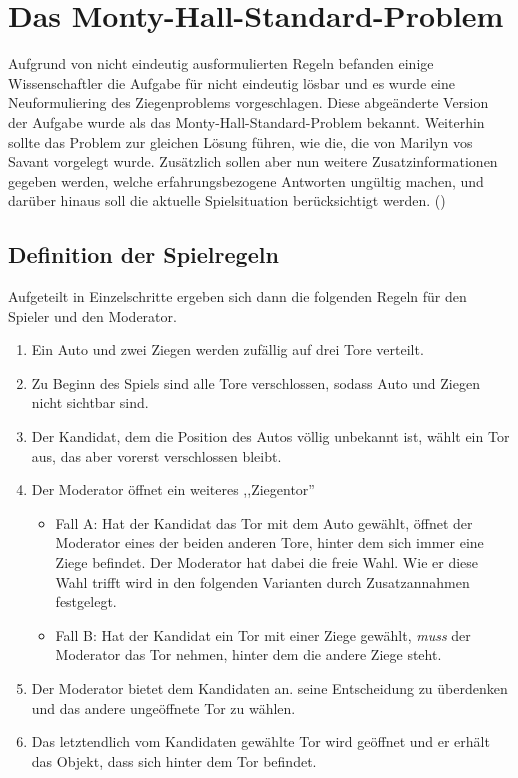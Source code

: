 \chapter{Das Monty-Hall-Standard-Problem} \label{chap:monty-hall-standard}

Aufgrund von nicht eindeutig ausformulierten Regeln befanden einige Wissenschaftler die Aufgabe für nicht eindeutig lösbar und es wurde eine Neuformuliering des
Ziegenproblems vorgeschlagen. Diese abgeänderte Version der Aufgabe wurde als das Monty-Hall-Standard-Problem bekannt. Weiterhin sollte das Problem zur gleichen
Lösung führen, wie die, die von Marilyn vos Savant vorgelegt wurde. Zusätzlich sollen aber nun weitere Zusatzinformationen gegeben werden, welche erfahrungsbezogene Antworten ungültig
machen, und darüber hinaus soll die aktuelle Spielsituation berücksichtigt werden. (\cite{Mueser:1999})

\section{Definition der Spielregeln}

Aufgeteilt in Einzelschritte ergeben sich dann die folgenden Regeln für den Spieler und den Moderator.
\begin{enumerate}
    \item Ein Auto und zwei Ziegen werden zufällig auf drei Tore verteilt.
    \item Zu Beginn des Spiels sind alle Tore verschlossen, sodass Auto und Ziegen nicht sichtbar sind.
    \item Der Kandidat, dem die Position des Autos völlig unbekannt ist, wählt ein Tor aus, das aber vorerst verschlossen bleibt.
    \item Der Moderator öffnet ein weiteres ,,Ziegentor''\begin{itemize}
              \item Fall A: Hat der Kandidat das Tor mit dem Auto gewählt, öffnet der Moderator eines der beiden anderen Tore, hinter dem sich immer eine Ziege befindet.
                    Der Moderator hat dabei die freie Wahl. Wie er diese Wahl trifft wird in den folgenden Varianten durch Zusatzannahmen festgelegt.
              \item Fall B: Hat der Kandidat ein Tor mit einer Ziege gewählt, \textit{muss} der Moderator das Tor nehmen, hinter dem die andere Ziege steht.
          \end{itemize}
    \item Der Moderator bietet dem Kandidaten an. seine Entscheidung zu überdenken und das andere ungeöffnete Tor zu wählen.
    \item Das letztendlich vom Kandidaten gewählte Tor wird geöffnet und er erhält das Objekt, dass sich hinter dem Tor befindet.
\end{enumerate}

